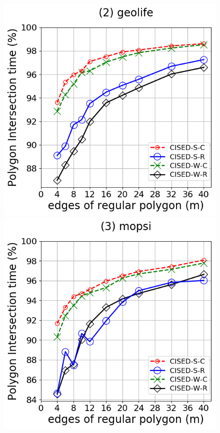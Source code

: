 {\begin{figure}[tb!]
	\includegraphics[scale = 0.275]{Figures/Exp-M-poly-time-ratio-geolife.png}\hspace{3ex}
	\includegraphics[scale = 0.275]{Figures/Exp-M-poly-time-ratio-mopsi.png}\hspace{3ex}

\end{figure}}
